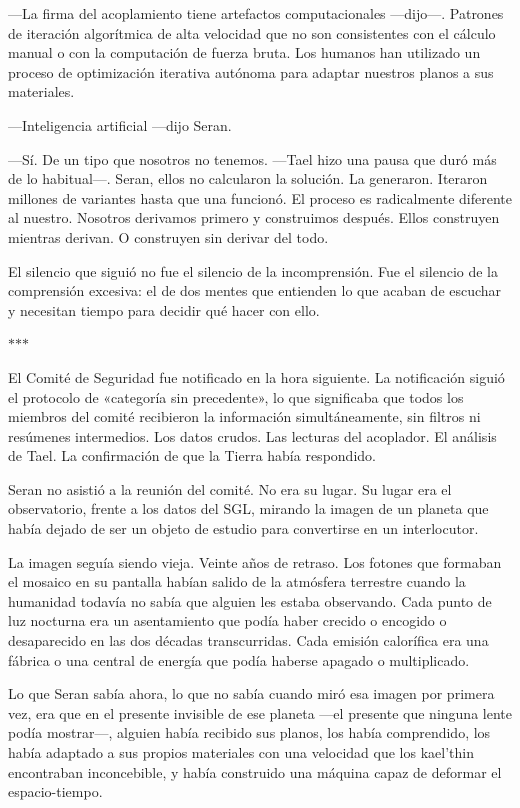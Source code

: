 \documentclass[11pt,a5paper,twoside]{book}
\begin{document}
—La firma del acoplamiento tiene artefactos computacionales —dijo—. Patrones de iteración algorítmica de alta velocidad que no son consistentes con el cálculo manual o con la computación de fuerza bruta. Los humanos han utilizado un proceso de optimización iterativa autónoma para adaptar nuestros planos a sus materiales.

—Inteligencia artificial —dijo Seran.

—Sí. De un tipo que nosotros no tenemos. —Tael hizo una pausa que duró más de lo habitual—. Seran, ellos no calcularon la solución. La generaron. Iteraron millones de variantes hasta que una funcionó. El proceso es radicalmente diferente al nuestro. Nosotros derivamos primero y construimos después. Ellos construyen mientras derivan. O construyen sin derivar del todo.

El silencio que siguió no fue el silencio de la incomprensión. Fue el silencio de la comprensión excesiva: el de dos mentes que entienden lo que acaban de escuchar y necesitan tiempo para decidir qué hacer con ello.

\vspace{1.5em}
\begin{center}$\ast$\quad$\ast$\quad$\ast$\end{center}
\vspace{1.5em}

El Comité de Seguridad fue notificado en la hora siguiente. La notificación siguió el protocolo de «categoría sin precedente», lo que significaba que todos los miembros del comité recibieron la información simultáneamente, sin filtros ni resúmenes intermedios. Los datos crudos. Las lecturas del acoplador. El análisis de Tael. La confirmación de que la Tierra había respondido.

Seran no asistió a la reunión del comité. No era su lugar. Su lugar era el observatorio, frente a los datos del SGL, mirando la imagen de un planeta que había dejado de ser un objeto de estudio para convertirse en un interlocutor.

La imagen seguía siendo vieja. Veinte años de retraso. Los fotones que formaban el mosaico en su pantalla habían salido de la atmósfera terrestre cuando la humanidad todavía no sabía que alguien les estaba observando. Cada punto de luz nocturna era un asentamiento que podía haber crecido o encogido o desaparecido en las dos décadas transcurridas. Cada emisión calorífica era una fábrica o una central de energía que podía haberse apagado o multiplicado.

Lo que Seran sabía ahora, lo que no sabía cuando miró esa imagen por primera vez, era que en el presente invisible de ese planeta —el presente que ninguna lente podía mostrar—, alguien había recibido sus planos, los había comprendido, los había adaptado a sus propios materiales con una velocidad que los kael'thin encontraban inconcebible, y había construido una máquina capaz de deformar el espacio-tiempo.
\end{document}
